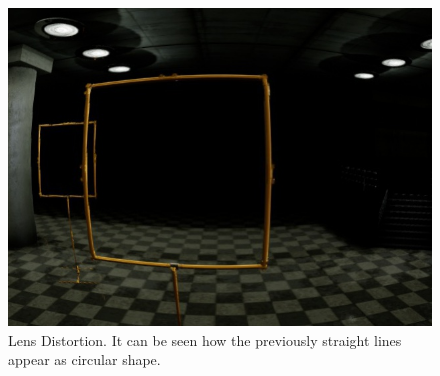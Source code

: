 \begin{figure}[bhtp]
\begin{minipage}{0.33\textwidth}
		\includegraphics[width=\textwidth]{fig/gate_example_distorted}
		\caption{Lens Distortion. It can be seen how the previously straight lines appear as circular shape.}		
		\label{fig:distortion}
	\end{minipage}
	

\end{figure}
